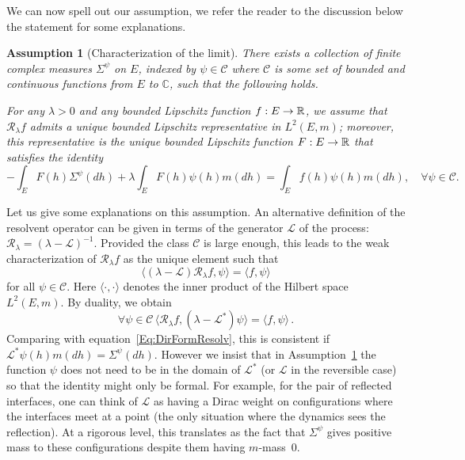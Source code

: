 \documentclass[AHL,Unicode,longabstracts]{cedram}
\theoremstyle{plain}
\newtheorem{assu}[cdrthm]{Assumption}}
\newcommand{\cC}{\mathcal{C}}
\newcommand{\cL}{\mathcal{L}}
\newcommand{\cR}{\mathcal{R}}
\newcommand{\R}{\mathbb{R}}
\newcommand{\C}{\mathbb{C}}
\let\oldforall\forall
\renewcommand*{\forall}{\mathrel{\oldforall}}
\renewcommand*{\to}{\mathchoice{\longrightarrow}{\rightarrow}{\rightarrow}{\rightarrow}}
\begin{document}
We can now spell out our assumption, we refer the reader to the discussion below the statement for some explanations.

\begin{assu}[Characterization of the limit]\label{Ass:Charac}
There exists a collection of finite complex measures $\Sigma^{\psi}$ on $E$, indexed by $\psi \in \cC$ where $\cC$ is some set of bounded and continuous functions from $E$ to $\C$, such that the following holds.

For any $\lambda > 0$ and any bounded Lipschitz function $f:E\to \R$, we assume that $\cR_\lambda f$ admits a unique bounded Lipschitz representative in $L^2(E,m)$; moreover, this representative is the unique bounded Lipschitz function $F:E\to\R$ that satisfies the identity
\begin{equation}\label{Eq:DirFormResolv}
-\int_E F(h) \Sigma^{\psi}(dh) + \lambda \int_E F(h) \psi(h) m(dh) = \int_E f(h) \psi(h) m(dh),\quad \forall \psi \in \cC.
\end{equation}
\end{assu}

Let us give some explanations on this assumption. An alternative definition of the resolvent operator can be given in terms of the generator $\cL$ of the process: $\cR_\lambda = (\lambda - \cL)^{-1}$. Provided the class $\cC$ is large enough, this leads to the weak characterization of $\cR_\lambda f$ as the unique element such that
\[
\langle (\lambda - \cL) \cR_\lambda f, \psi \rangle = \langle f, \psi \rangle
\]
for all $\psi \in \cC$. Here $\langle \cdot,\cdot\rangle$ denotes the inner product of the Hilbert space $L^2(E,m)$. By duality, we obtain
\[
\forall \psi\in\cC \, \langle \cR_\lambda f, (\lambda - \cL^*)\psi \rangle = \langle f, \psi \rangle \,.
\]
Comparing with equation~\eqref{Eq:DirFormResolv}, this is consistent if $\cL^* \psi(h) m(dh) = \Sigma^\psi(dh)$. However we insist that in Assumption~\ref{Ass:Charac} the function $\psi$ does not need to be in the domain of $\cL^*$ (or $\cL$ in the reversible case) so that the identity might only be formal. For example, for the pair of reflected interfaces, one can think of $\cL$ as having a Dirac weight on configurations where the interfaces meet at a point (the only situation where the dynamics sees the reflection). At a rigorous level, this translates as the fact that $ \Sigma^{\psi}$ gives positive mass to these configurations despite them having $m$-mass~$0$.
\end{document}
